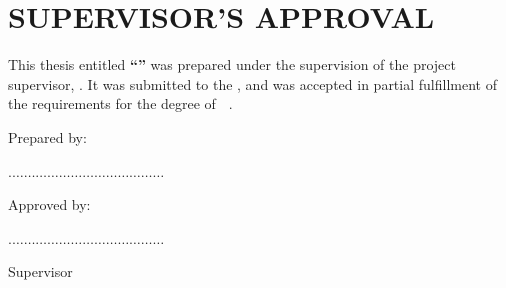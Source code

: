 \chapter{SUPERVISOR'S APPROVAL}

\makeatletter
This thesis entitled \textbf{``{\@title}''} was prepared under the supervision of the project supervisor, {\@supervisor}. It was submitted to the {\@faculty}, and was accepted in partial fulfillment of the requirements for the degree of \textbf{\@programme~\@programmeT}.\par
\vspace{2cm}\par
\noindent Prepared by:\par
\vspace{2cm}\par
\noindent.$\dots\dots\dots\dots\dots\dots\dots\dots\dots\dots\dots\dots\dots$\par
\noindent{\@author}\par
\noindent{\@studentid}\par
\vspace{1cm}\par
\noindent Approved by:\par
\vspace{2cm}\par
\noindent.$\dots\dots\dots\dots\dots\dots\dots\dots\dots\dots\dots\dots\dots$\par
\noindent{\@supervisor}\par
\noindent Supervisor\par
\vspace{1cm}
\noindent\@datesubmit 
\makeatother
